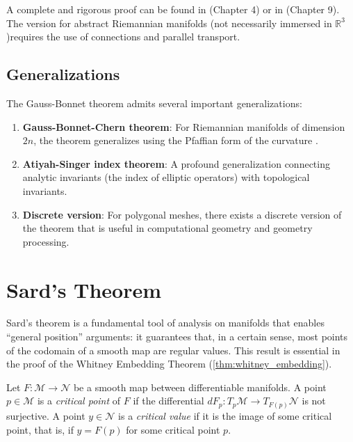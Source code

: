 \begin{remark}
A complete and rigorous proof can be found in \citet{do1976differential}(Chapter 4) or in \citet{lee2018introduction} (Chapter 9). The version for abstract Riemannian manifolds (not necessarily immersed in $\mathbb{R}^3$)requires the use of connections and parallel transport.
\end{remark}

\subsection{Generalizations}\label{subsec:gauss_bonnet_generalizaciones}

The Gauss-Bonnet theorem admits several important generalizations:

\begin{enumerate}
    \item \textbf{Gauss-Bonnet-Chern theorem}: For Riemannian manifolds of dimension $2n$, the theorem generalizes using the Pfaffian form of the curvature \citep{chern1944simple}.

    \item \textbf{Atiyah-Singer index theorem}: A profound generalization connecting analytic invariants (the index of elliptic operators) with topological invariants.

    \item \textbf{Discrete version}: For polygonal meshes, there exists a discrete version of the theorem that is useful in computational geometry and geometry processing.
\end{enumerate}

\section{Sard's Theorem}\label{sec:sard}

Sard's theorem is a fundamental tool of analysis on manifolds that enables ``general position'' arguments: it guarantees that, in a certain sense, most points of the codomain of a smooth map are regular values. This result is essential in the proof of the Whitney Embedding Theorem (\autoref{thm:whitney_embedding}).

\begin{definition}\label{def:punto_critico}
Let $F: \mathcal{M} \to \mathcal{N}$ be a smooth map between differentiable manifolds. A point $p \in \mathcal{M}$ is a \textit{critical point} of $F$ if the differential $dF_p: T_p\mathcal{M} \to T_{F(p)}\mathcal{N}$ is not surjective. A point $y \in \mathcal{N}$ is a \textit{critical value} if it is the image of some critical point, that is, if $y = F(p)$ for some critical point $p$.
\end{definition}

